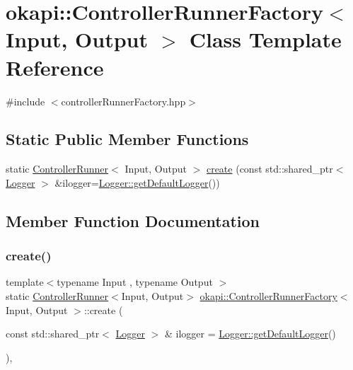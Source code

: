 \hypertarget{classokapi_1_1ControllerRunnerFactory}{}\section{okapi\+::Controller\+Runner\+Factory$<$ Input, Output $>$ Class Template Reference}
\label{classokapi_1_1ControllerRunnerFactory}


{\ttfamily \#include $<$controller\+Runner\+Factory.\+hpp$>$}

\subsection*{Static Public Member Functions}
\begin{DoxyCompactItemize}
\item 
static \mbox{\hyperlink{classokapi_1_1ControllerRunner}{Controller\+Runner}}$<$ Input, Output $>$ \mbox{\hyperlink{classokapi_1_1ControllerRunnerFactory_a979365d1b7cfaab76828765a5791da5b}{create}} (const std\+::shared\+\_\+ptr$<$ \mbox{\hyperlink{classokapi_1_1Logger}{Logger}} $>$ \&ilogger=\mbox{\hyperlink{classokapi_1_1Logger_a5053cf778b4b55acba788a3797dc96d2}{Logger\+::get\+Default\+Logger}}())
\end{DoxyCompactItemize}


\subsection{Member Function Documentation}
\mbox{\label{classokapi_1_1ControllerRunnerFactory_a979365d1b7cfaab76828765a5791da5b}} 
\subsubsection{\texorpdfstring{create()}{create()}}
{\footnotesize\ttfamily template$<$typename Input , typename Output $>$ \\
static \mbox{\hyperlink{classokapi_1_1ControllerRunner}{Controller\+Runner}}$<$Input, Output$>$ \mbox{\hyperlink{classokapi_1_1ControllerRunnerFactory}{okapi\+::\+Controller\+Runner\+Factory}}$<$ Input, Output $>$\+::create (\begin{DoxyParamCaption}\item[{const std\+::shared\+\_\+ptr$<$ \mbox{\hyperlink{classokapi_1_1Logger}{Logger}} $>$ \&}]{ilogger = {\ttfamily \mbox{\hyperlink{classokapi_1_1Logger_a5053cf778b4b55acba788a3797dc96d2}{Logger\+::get\+Default\+Logger}}()} }\end{DoxyParamCaption})\hspace{0.3cm}{\ttfamily [inline]}, {\ttfamily [static]}}

